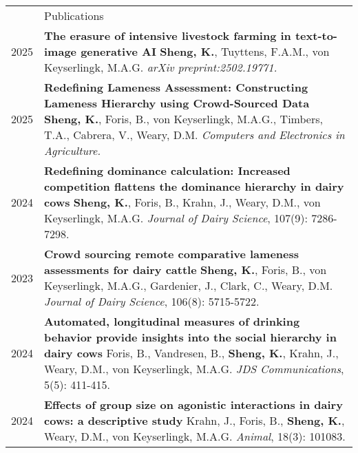 \documentclass[letterpaper, 11pt]{article}
\newcommand{\headingfont}{\Large\color{OliveGreen}}
\newenvironment{SectionTable}[1]{
	\renewcommand*{\arraystretch}{1.7}
	\setlength{\tabcolsep}{10pt}
	\begin{longtable}{Rp{5.2in}} & #1 \\}
{\end{longtable}\vspace{-.3cm}}
\begin{document}
\begin{SectionTable}{\headingfont Publications}
2025 & 
\textbf{{The erasure of intensive livestock farming in text-to-image generative AI}} \newline
\textbf{Sheng, K.}, Tuyttens, F.A.M., von Keyserlingk, M.A.G. \newline
\textit{arXiv preprint:2502.19771. }  \\
2025 &
\textbf{{Redefining Lameness Assessment: Constructing Lameness Hierarchy using Crowd-Sourced Data}} \newline
\textbf{Sheng, K.}, Foris, B., von Keyserlingk, M.A.G., Timbers, T.A., Cabrera, V., Weary, D.M. \newline
\textit{Computers and Electronics in Agriculture. }\\
2024 & 
\textbf{{Redefining dominance calculation: Increased competition flattens the dominance hierarchy in dairy cows}} \newline
\textbf{Sheng, K.}, Foris, B., Krahn, J., Weary, D.M., von Keyserlingk, M.A.G. \newline
\textit{Journal of Dairy Science}, 107(9): 7286-7298.  \\
2023 & 
\textbf{{Crowd sourcing remote comparative lameness assessments for dairy cattle}} \newline
\textbf{Sheng, K.}, Foris, B., von Keyserlingk, M.A.G., Gardenier, J., Clark, C., Weary, D.M. \newline
\textit{Journal of Dairy Science}, 106(8): 5715-5722. \\
2024 & 
\textbf{{Automated, longitudinal measures of drinking behavior provide insights into the social hierarchy in dairy cows}} \newline
Foris, B., Vandresen, B., \textbf{Sheng, K.}, Krahn, J., Weary, D.M., von Keyserlingk, M.A.G. \newline
\textit{JDS Communications}, 5(5): 411-415. \\
2024 & 
\textbf{{Effects of group size on agonistic interactions in dairy cows: a descriptive study}} \newline
Krahn, J., Foris, B., \textbf{Sheng, K.}, Weary, D.M., von Keyserlingk, M.A.G. \newline
\textit{Animal}, 18(3): 101083. 
\end{SectionTable}
\end{document}
